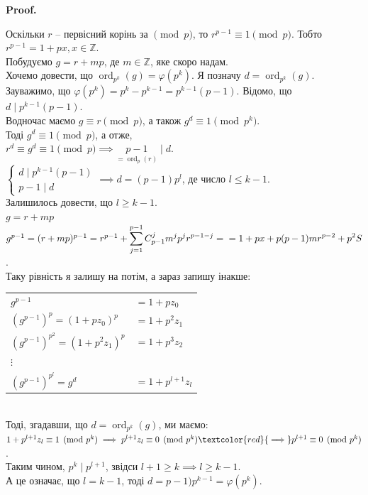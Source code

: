 \documentclass[a4paper, 10pt]{article}
\makeatletter
\theoremstyle{theoremdd}
\theoremstyle{theoremdd}
\theoremstyle{theoremdd}
\theoremstyle{theoremdd}
\theoremstyle{theoremdd}
\theoremstyle{theoremdd}
\theoremstyle{theoremdd}
\theoremstyle{theoremdd}
\renewenvironment{proof}[1][Proof.\\]{\par
\pushQED{\hfill \qed}%
\normalfont \topsep6\p@\@plus6\p@\relax
\trivlist
\item\relax
{\bfseries
#1\@addpunct{.}}\hspace\labelsep\ignorespaces
}{%
\popQED\endtrivlist\@endpefalse
}
\DeclareMathOperator{\ord}{ord}
\makeatother
\begin{document}
\begin{proof}
Оскільки $r$ -- первісний корінь за $\!\!\pmod p$, то $r^{p-1} \equiv 1 \pmod p$. Тобто $r^{p-1} = 1 + px, x \in \mathbb{Z}$.\\
Побудуємо $g = r+mp$, де $m \in \mathbb{Z}$, яке скоро надам.\\
Хочемо довести, що $\ord_{p^k} (g) = \varphi(p^k)$. Я позначу $d =\ord_{p^k} (g)$.\\
Зауважимо, що $\varphi(p^k) = p^k - p^{k-1} = p^{k-1}(p-1)$.
Відомо, що $d \mid p^{k-1} (p-1)$.\\
Водночас маємо $g \equiv r \pmod p$, а також $g^d \equiv 1 \pmod {p^k}$.\\
Тоді $g^d \equiv 1 \pmod p$, а отже,\\
$r^d \equiv g^d \equiv 1 \pmod p \implies \underset{=\ord_p(r)}{p-1} \mid d$.\\
$\begin{cases} d \mid p^{k-1}(p-1) \\ p-1 \mid d \end{cases} \implies d = (p-1)p^l$, де число $l \leq k-1$.\\
Залишилось довести, що $l \geq k-1$.
\bigskip \\
$g = r + mp$\\
$g^{p-1} = (r+mp)^{p-1} = r^{p-1} + \displaystyle\sum_{j=1}^{p-1} C_{p-1}^j m^j p^j r^{p-1-j} = \\ = 1+px + p(p-1)mr^{p-2} + p^2S$.\\
Таку рівність я залишу на потім, а зараз запишу інакше:\\
\begin{tabular}{ll}
$g^{p-1}$ & $= 1 + pz_0$\\
$(g^{p-1})^p = (1+pz_0)^p$ & $= 1 + p^2z_1$\\
$(g^{p-1})^{p^2} = (1+p^2z_1)^p$ & $= 1 + p^3z_2$\\
$\vdots$ & \\
$(g^{p-1})^{p^l} = g^d$ & $= 1+p^{l+1}z_l$
\end{tabular}\\
Тоді, згадавши, що $d = \ord_{p^k} (g)$, ми маємо:\\
$1 + p^{l+1}z_l \equiv 1 \pmod {p^k} \implies p^{l+1}z_l \equiv 0 \pmod {p^k} \textcolor{red}{\implies} p^{l+1} \equiv 0 \pmod {p^k}$.\\
Таким чином, $p^k \mid p^{l+1}$, звідси $l+1 \geq k \implies l \geq k-1$.\\
А це означає, що $l=k-1$, тоді $d = p-1)p^{k-1} = \varphi(p^k)$.\\

\end{proof}
\end{document}
